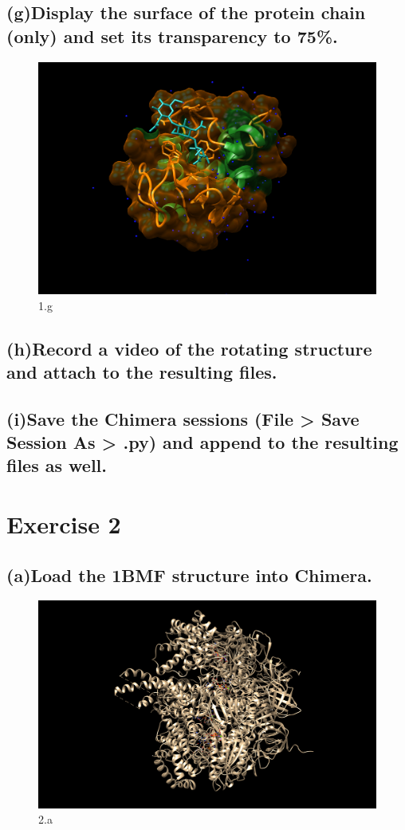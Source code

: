 \documentclass[a4paper, 12pt, one column]{article}
\begin{document}
\subsection*{(g)Display the surface of the protein chain (only) and set its transparency to 75\%.}
\begin{figure}[H]
    \centering
    \includegraphics[width=.8\linewidth]{1_g.png}
    \caption{1.g}
    \label{fig:1_g.png}
\end{figure}

\subsection*{(h)Record a video of the rotating structure and attach to the resulting files.}
\subsection*{(i)Save the Chimera sessions (File > Save Session As > .py) and append to the resulting
files as well.}

\section{Exercise 2}
\subsection*{(a)Load the 1BMF structure into Chimera.}
\begin{figure}[H]
    \centering
    \includegraphics[width=.8\linewidth]{2_a.png}
    \caption{2.a}
    \label{fig:2_a.png}
\end{figure}
\end{document}

